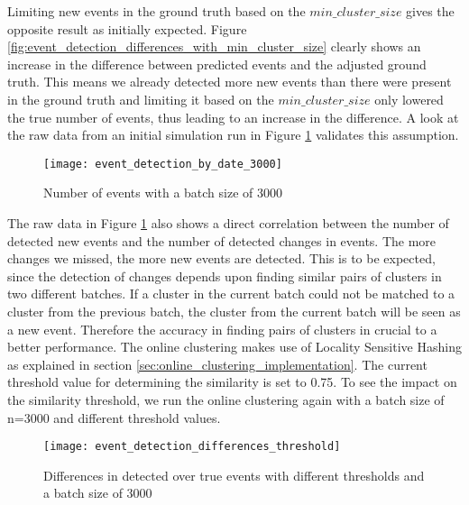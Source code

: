 Limiting new events in the ground truth based on the $min\_cluster\_size$
gives the opposite result as initially expected.
Figure \ref{fig:event_detection_differences_with_min_cluster_size} clearly shows
an increase in the difference between predicted events and the adjusted ground truth.
This means we already detected more new events than there were present in the ground truth
and limiting it based on the $min\_cluster\_size$ only lowered the true number of events,
thus leading to an increase in the difference.
A look at the raw data from an initial simulation run in Figure \ref{fig:event_detection_by_date_3000}
validates this assumption.

\begin{figure}[h]
    \centering
    \texttt{[image: event\_detection\_by\_date\_3000]}
    \caption{Number of events with a batch size of 3000}
    \label{fig:event_detection_by_date_3000}
\end{figure}

The raw data in Figure \ref{fig:event_detection_by_date_3000}
also shows a direct correlation between the number of detected new events and the number of detected changes in events.
The more changes we missed, the more new events are detected.
This is to be expected,
since the detection of changes depends upon finding similar pairs of clusters in two different batches.
If a cluster in the current batch could not be matched to a cluster from the previous batch,
the cluster from the current batch will be seen as a new event.
Therefore the accuracy in finding pairs of clusters in crucial to a better performance.
The online clustering makes use of Locality Sensitive Hashing
as explained in section \ref{sec:online_clustering_implementation}.
The current threshold value for determining the similarity is set to 0.75.
To see the impact on the similarity threshold,
we run the online clustering again with a batch size of n=3000 and different threshold values.

\begin{figure}[h]
    \centering
    \texttt{[image: event\_detection\_differences\_threshold]}
    \caption{Differences in detected over true events with different thresholds and a batch size of 3000}
    \label{fig:event_detection_differences_threshold}
\end{figure}

